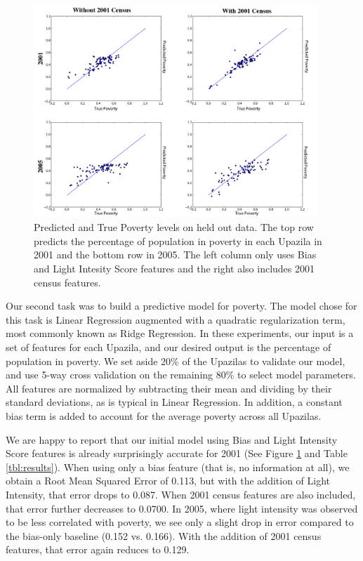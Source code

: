 \documentclass[10pt, letterpaper]{article}
\theoremstyle{plain}
\theoremstyle{definition}
\begin{document}
\begin{figure}
  \centering
  \includegraphics[width=0.95\textwidth]{figures/poverty-predictions}
  \caption{Predicted and True Poverty levels on held out data. The top row predicts the percentage of population in poverty in each Upazila in 2001 and the bottom row in 2005. The left column only uses Bias and Light Intesity Score features and the right also includes 2001 census features.}
  \label{fig:poverty-predictions}
\end{figure}

  Our second task was to build a predictive model for poverty.  The model chose for this task is Linear Regression augmented with a quadratic regularization term, most commonly known as Ridge Regression. In these experiments, our input is a set of features for each Upazila, and our desired output is the percentage of population in poverty. We set aside 20\% of the Upazilas to validate our model, and use 5-way cross validation on the remaining 80\% to select model parameters.  All features are normalized by subtracting their mean and dividing by their standard deviations, as is typical in Linear Regression.  In addition, a constant bias term is added to account for the average poverty across all Upazilas.
  
  We are happy to report that our initial model using Bias and Light Intensity Score features is already surprisingly accurate for 2001 (See Figure \ref{fig:poverty-predictions} and Table \ref{tbl:results}). When using only a bias feature (that is, no information at all), we obtain a Root Mean Squared Error of 0.113, but with the addition of Light Intensity, that error drops to 0.087. When 2001 census features are also included, that error further decreases to 0.0700.  In 2005, where light intensity was observed to be less correlated with poverty, we see only a slight drop in error compared to the bias-only baseline (0.152 vs. 0.166).  With the addition of 2001 census features, that error again reduces to 0.129.  
  
\end{document}
